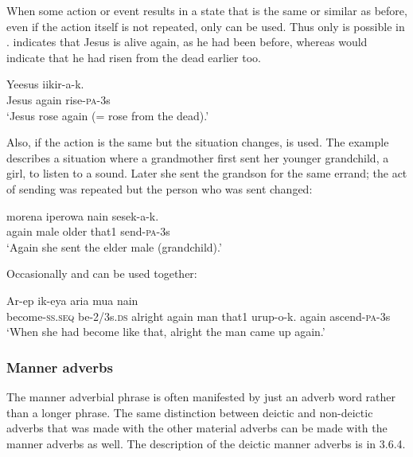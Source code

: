 When some action or event results in a state that is the same or similar as before, even if the action itself is not repeated, only\textstyleStyleVernacularWordsItalic{}  can be used. Thus only  is possible in .  indicates that Jesus is alive again, as he had been before, whereas  would indicate that he had risen from the dead earlier too.

\ea%
\label{ex:3:x503}
\gll Yeesus  iikir-a-k. \\
Jesus again rise-\textsc{pa}-3s\\
\glt`Jesus rose again (= rose from the dead).'
\z

Also, if the action is the same but the situation changes,  is used. The example  describes a situation where a grandmother first sent her younger grandchild, a girl, to listen to a sound. Later she sent the grandson for the same errand; the act of sending was repeated but the person who was sent changed:

\ea%
\label{ex:3:x1761}
\gll {} morena iperowa nain sesek-a-k. \\
again male older that1 send-\textsc{pa}-3s\\
\glt`Again she sent the elder male (grandchild).'
\z

Occasionally  and  can be used together:

\ea%
\label{ex:3:x700}
\gll Ar-ep ik-eya aria  mua nain \\
become-\textsc{ss}.\textsc{seq} be-2/3s.\textsc{ds} alright again man that1
 urup-o-k.
again ascend-\textsc{pa}-3s\\
\glt`When she had become like that, alright the man came up again.'
\z

\subsubsection{Manner adverbs}\label{sec:3:z:y:x}
{}
The manner adverbial phrase is often manifested by just an adverb word rather than a longer phrase. The same distinction between deictic and non-deictic adverbs that was made with the other material adverbs can be made with the manner adverbs as well. The description of the deictic manner adverbs is in 3.6.4.

